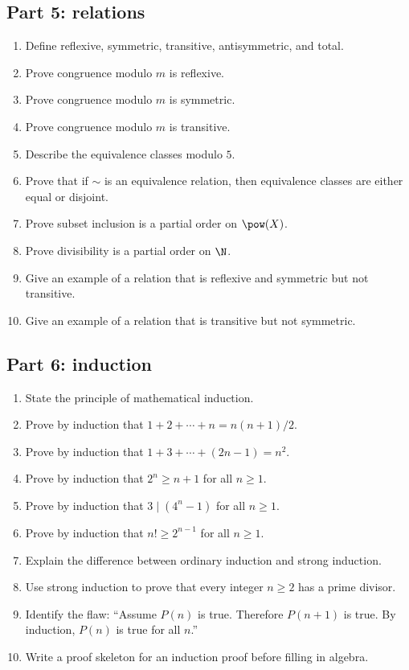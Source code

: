 \subsection{Part 5: relations}

\begin{enumerate}
\item Define reflexive, symmetric, transitive, antisymmetric, and total.
\item Prove congruence modulo $m$ is reflexive.
\item Prove congruence modulo $m$ is symmetric.
\item Prove congruence modulo $m$ is transitive.
\item Describe the equivalence classes modulo $5$.
\item Prove that if $\sim$ is an equivalence relation, then equivalence classes are either equal or disjoint.
\item Prove subset inclusion is a partial order on $\pow(X)$.
\item Prove divisibility is a partial order on $\N$.
\item Give an example of a relation that is reflexive and symmetric but not transitive.
\item Give an example of a relation that is transitive but not symmetric.
\end{enumerate}

\subsection{Part 6: induction}

\begin{enumerate}
\item State the principle of mathematical induction.
\item Prove by induction that $1+2+\cdots+n=n(n+1)/2$.
\item Prove by induction that $1+3+\cdots+(2n-1)=n^2$.
\item Prove by induction that $2^n\geq n+1$ for all $n\geq1$.
\item Prove by induction that $3\mid(4^n-1)$ for all $n\geq1$.
\item Prove by induction that $n! \geq 2^{n-1}$ for all $n\geq1$.
\item Explain the difference between ordinary induction and strong induction.
\item Use strong induction to prove that every integer $n\geq2$ has a prime divisor.
\item Identify the flaw: ``Assume $P(n)$ is true. Therefore $P(n+1)$ is true. By induction, $P(n)$ is true for all $n$.''
\item Write a proof skeleton for an induction proof before filling in algebra.
\end{enumerate}

